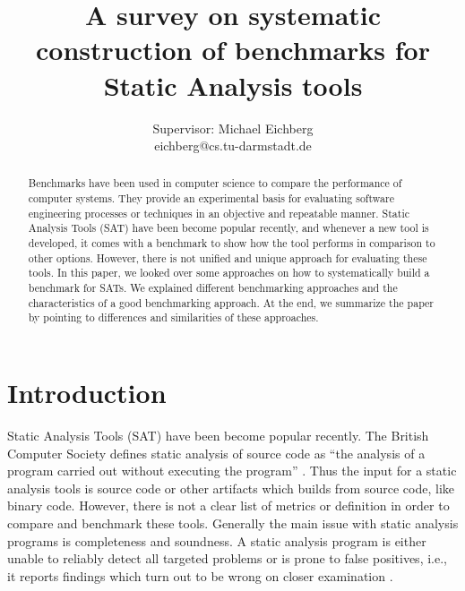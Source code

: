 \documentclass[authoryear,preprint]{sigplanconf}
\begin{document}
	\setlength{\pdfpageheight}{\paperheight}
	\setlength{\pdfpagewidth}{\paperwidth}
	
	\title{A survey on systematic construction of benchmarks for Static Analysis tools}
	\subtitle{Supervisor: Michael Eichberg \\ eichberg@cs.tu-darmstadt.de}
	
	
	\maketitle


\begin{abstract}
	Benchmarks have been used in computer science to compare the performance of computer systems. They provide an experimental basis for evaluating software engineering processes or techniques in an objective and repeatable manner. Static Analysis Tools (SAT) have been become popular recently, and whenever a new tool is developed, it comes with a benchmark to show how the tool performs in comparison to other options. However, there is not unified and unique approach for evaluating these tools. In this paper, we looked over some approaches on how to systematically build a benchmark for SATs. We explained different benchmarking approaches and  the characteristics of a good benchmarking approach. At the end, we summarize the paper by pointing to differences and similarities of these approaches.
\end{abstract}

\section{Introduction}
\label{sec:introduction}
Static Analysis Tools (SAT) have been become popular recently. The British Computer Society defines static analysis of source code as ``the analysis of a program carried out without executing the program'' \cite{Glossary_of_term}. Thus the input for a static analysis tools is source code or other artifacts which builds from source code, like binary code. However, there is not a clear list of metrics or definition in order to compare and benchmark these tools. Generally the main issue with static analysis programs is completeness and soundness. A static analysis program is either unable to reliably detect all targeted problems or is prone to false positives, i.e., it reports findings which turn out to be wrong on closer examination \cite{Scanstud}. 
\end{document}
